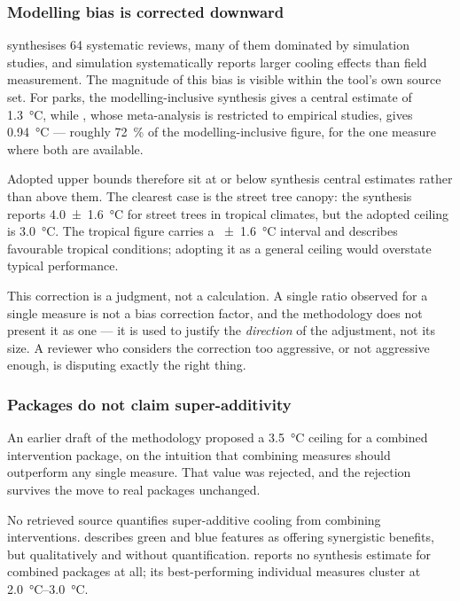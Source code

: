 \subsubsection{Modelling bias is corrected downward}
\label{sec:modelling-bias}

\textcite{keravec2026} synthesises 64 systematic reviews, many of them
dominated by simulation studies, and simulation systematically reports larger
cooling effects than field measurement. The magnitude of this bias is visible
within the tool's own source set. For parks, the modelling-inclusive synthesis
gives a central estimate of \qty{1.3}{\degreeCelsius}, while
\textcite{bowler2010}, whose meta-analysis is restricted to empirical studies,
gives \qty{0.94}{\degreeCelsius} --- roughly \SI{72}{\percent} of the
modelling-inclusive figure, for the one measure where both are available.

Adopted upper bounds therefore sit at or below synthesis central estimates
rather than above them. The clearest case is the street tree canopy: the
synthesis reports \qty{4.0(16)}{\degreeCelsius} for street trees in tropical
climates, but the adopted ceiling is \qty{3.0}{\degreeCelsius}. The tropical
figure carries a \qty{\pm 1.6}{\degreeCelsius} interval and describes
favourable tropical conditions; adopting it as a general ceiling would overstate
typical performance.

This correction is a judgment, not a calculation. A single ratio observed for a
single measure is not a bias correction factor, and the methodology does not
present it as one --- it is used to justify the \emph{direction} of the
adjustment, not its size. A reviewer who considers the correction too
aggressive, or not aggressive enough, is disputing exactly the right thing.

\subsubsection{Packages do not claim super-additivity}
\label{sec:super-additivity}

An earlier draft of the methodology proposed a \qty{3.5}{\degreeCelsius}
ceiling for a combined intervention package, on the intuition that combining
measures should outperform any single measure. That value was rejected, and the
rejection survives the move to real packages unchanged.

No retrieved source quantifies super-additive cooling from combining
interventions. \textcite{gunawardena2017} describes green and blue features as
offering synergistic benefits, but qualitatively and without quantification.
\textcite{keravec2026} reports no synthesis estimate for combined packages at
all; its best-performing individual measures cluster at
\SIrange{2.0}{3.0}{\degreeCelsius}.

